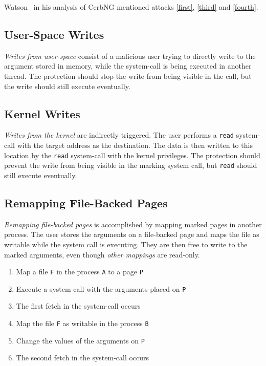 Watson~\cite{watson2007exploiting} in his analysis of CerbNG mentioned attacks
\autoref{first}, \autoref{third} and \autoref{fourth}.

\subsection{User-Space Writes}

\emph{Writes from user-space} consist of a malicious user trying to directly
write to the argument stored in memory, while the system-call is being executed
in another thread. The protection should stop the write from being visible in
the call, but the write should still execute eventually.

\subsection{Kernel Writes}

\emph{Writes from the kernel} are indirectly triggered. The user performs a
\texttt{read} system-call with the target address as the destination. The data
is then written to this location by the \texttt{read} system-call with the
kernel privileges. The protection should prevent the write from being visible in
the marking system call, but \texttt{read} should still execute eventually.

\subsection{Remapping File-Backed Pages}

\emph{Remapping file-backed pages} is accomplished by mapping marked pages in
another process. The user stores the arguments on a file-backed page and maps
the file as writable while the system call is executing. They are then free to
write to the marked arguments, even though \emph{other mappings} are read-only.

\begin{enumerate}
  \item Map a file \texttt{F} in the process \texttt{A} to a page \texttt{P}
  \item Execute a system-call with the arguments placed on \texttt{P}
  \item The first fetch in the system-call occurs
  \item Map the file \texttt{F} as writable in the process \texttt{B}
  \item Change the values of the arguments on \texttt{P}
  \item The second fetch in the system-call occurs
\end{enumerate}

